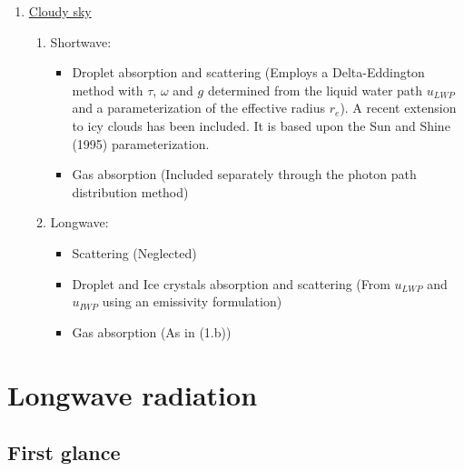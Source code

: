 \begin{enumerate}
\begin{enumerate}
\end{enumerate}


\item \underline{Cloudy sky}

\begin{enumerate}
\item Shortwave:

\begin{itemize}
            \item Droplet absorption and scattering (Employs a Delta-Eddington
method with $\tau$, $\omega$ and $g$ determined from the liquid water path
$u_{LWP}$ and a parameterization of the effective radius $r_{e}$). A recent
extension to icy clouds has been included. It is based upon the Sun and Shine
(1995)  parameterization.
            \item Gas absorption (Included separately through the photon path distribution method)
\end{itemize}

\item Longwave:

\begin{itemize}
             \item Scattering   (Neglected)
             \item Droplet and Ice crystals  absorption and scattering (From
$u_{LWP}$ and $u_{IWP}$ using an emissivity formulation)
             \item Gas absorption (As in (1.b))
\end{itemize}


\end{enumerate}

\end{enumerate}







\section[Longwave radiations]{Longwave radiation\footnotemark}
%
\label{section2}

%
\subsection{First glance}
%

